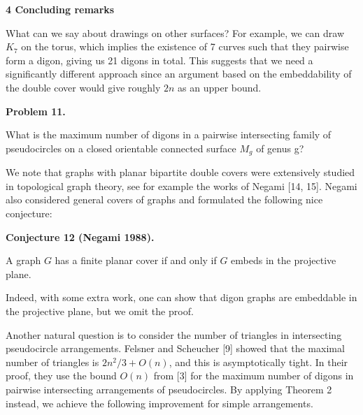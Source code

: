 \documentclass[10pt,a4paper]{amsart}
\begin{document}
\par\medskip\noindent\textbf{4 Concluding remarks}\par
What can we say about drawings on other surfaces? For example, we can draw $K_{7}$ on the torus, which implies the existence of 7 curves such that they pairwise form a digon, giving us 21 digons in total. This suggests that we need a significantly different approach since an argument based on the embeddability of the double cover would give roughly $2n$ as an upper bound.
\par
\par
\par\medskip\noindent\textbf{Problem 11.}\par
What is the maximum number of digons in a pairwise intersecting family of pseudocircles on a closed orientable connected surface $M_{g}$ of genus g?
\par
\par
\par
We note that graphs with planar bipartite double covers were extensively studied in topological graph theory, see for example the works of Negami [14, 15]. Negami also considered general covers of graphs and formulated the following nice conjecture:
\par
\par
\par\medskip\noindent\textbf{Conjecture 12 (Negami 1988).}\par
A graph $G$ has a finite planar cover if and only if $G$ embeds in the projective plane.
\par
\par
\par
Indeed, with some extra work, one can show that digon graphs are embeddable in the projective plane, but we omit the proof.
\par
\par
Another natural question is to consider the number of triangles in intersecting pseudocircle arrangements. Felsner and Scheucher [9] showed that the maximal number of triangles is $2n^{2}/3+O(n)$, and this is asymptotically tight. In their proof, they use the bound $O(n)$ from [3] for the maximum number of digons in pairwise intersecting arrangements of pseudocircles. By applying Theorem 2 instead, we achieve the following improvement for simple arrangements.
\par
\end{document}
